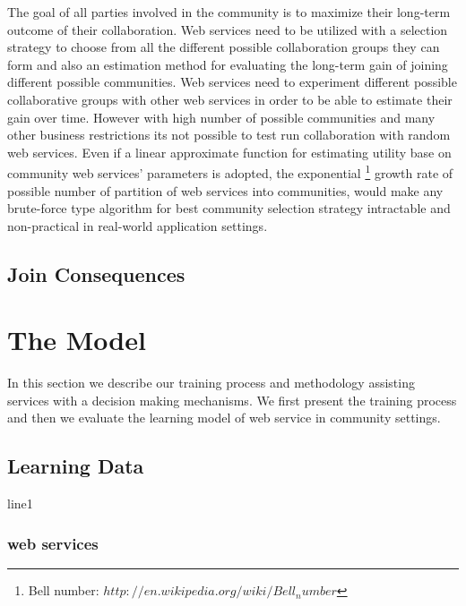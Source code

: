 \documentclass[10pt,journal,cspaper,compsoc]{IEEEtran}
\begin{document}
The goal of all parties involved in the community is to maximize their long-term outcome of their collaboration. Web services need to be utilized with a selection strategy to choose from all the different possible collaboration groups they can form and also an estimation method for evaluating the long-term gain of joining different possible communities. Web services need to experiment different possible collaborative groups with other web services in order to be able to estimate their gain over time. However with high number of possible communities and many other business restrictions its not possible to test run collaboration with random web services. Even if a linear approximate function for estimating utility base on community web services' parameters is adopted, the exponential \footnote{Bell number: $http://en.wikipedia.org/wiki/Bell_number$} growth rate of possible number of partition of web services into communities, would make any brute-force type algorithm for best community selection strategy intractable and non-practical in real-world application settings.

\subsection{Join Consequences}\label{s:jc}


\section{The Model}\label{s:model}

In this section we describe our training process and methodology assisting services with a decision making mechanisms. We first present the training process and then we evaluate the learning model of web service in community settings.

\subsection{Learning Data}\label{ss:learningdata}

line1

\subsubsection{web services}\label{sss:webservices}
\end{document}
